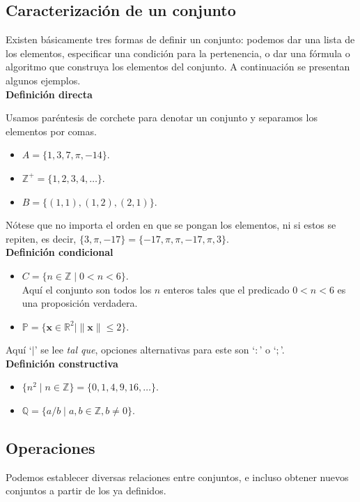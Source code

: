 \documentclass[12pt]{book}
\begin{document}
\subsection{Caracterización de un conjunto}
\noindent
Existen básicamente tres formas de definir un conjunto: podemos dar una lista de los elementos, especificar una condición para la pertenencia, o dar una fórmula o algoritmo que construya los elementos del conjunto. A continuación se presentan algunos ejemplos.\\


\textbf{Definición directa}

Usamos paréntesis de corchete para denotar un conjunto y separamos los elementos por comas.

\begin{itemize}
    \item $A=\{1,3,7,\pi,-14\}$.
    \item $\mathbb{Z^+}=\{1,2,3,4,\dots\}$.
    \item $B=\{(1,1),(1,2),(2,1)\}$.
\end{itemize}

Nótese que no importa el orden en que se pongan los elementos, ni si estos se repiten, es decir, $\{3,\pi,-17\}=\{-17,\pi,\pi,-17,\pi,3\}$.\\

\textbf{Definición condicional}

\begin{itemize}
    \item $C=\{n\in\mathbb{Z}\mid 0<n<6\}$.\\
    Aquí el conjunto son todos los $n$ enteros tales que el predicado $0<n<6$ es una proposición verdadera.
    \item $\mathbb{P}=\{\mathbf{x}\in\mathbb{R}^2 \mid \|\mathbf{x}\|\leq2\}$.
\end{itemize}

Aquí `$\mid$' se lee \textit{tal que}, opciones alternativas para este son `$:$' o `$;$'.\\

\textbf{Definición constructiva}

\begin{itemize}
    \item $\{n^2\mid n\in\mathbb{Z}\} = \{0,1,4,9,16,\dots\}$.
    \item $\mathbb{Q}=\{a/b\mid a,b\in\mathbb{Z},b \neq0\}$.
\end{itemize}

\subsection{Operaciones}\label{sec:operaciones_conj}
\noindent
Podemos establecer diversas relaciones entre conjuntos, e incluso obtener nuevos conjuntos a partir de los ya definidos.
\end{document}
